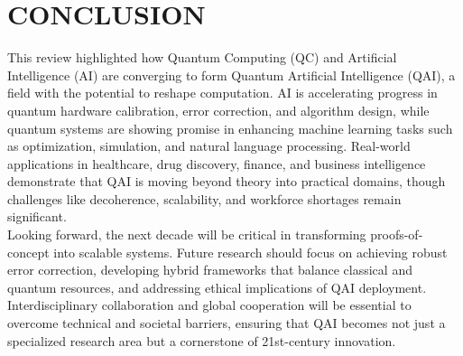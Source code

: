 \chapter{CONCLUSION}
\hspace*{0.3in}This review highlighted how Quantum Computing (QC) and Artificial Intelligence (AI) are converging to form Quantum Artificial Intelligence (QAI), a field with the potential to reshape computation. AI is accelerating progress in quantum hardware calibration, error correction, and algorithm design, while quantum systems are showing promise in enhancing machine learning tasks such as optimization, simulation, and natural language processing. Real-world applications in healthcare, drug discovery, finance, and business intelligence demonstrate that QAI is moving beyond theory into practical domains, though challenges like decoherence, scalability, and workforce shortages remain significant.\\

\hspace*{0.3in}Looking forward, the next decade will be critical in transforming proofs-of-concept into scalable systems. Future research should focus on achieving robust error correction, developing hybrid frameworks that balance classical and quantum resources, and addressing ethical implications of QAI deployment. Interdisciplinary collaboration and global cooperation will be essential to overcome technical and societal barriers, ensuring that QAI becomes not just a specialized research area but a cornerstone of 21st-century innovation.\\